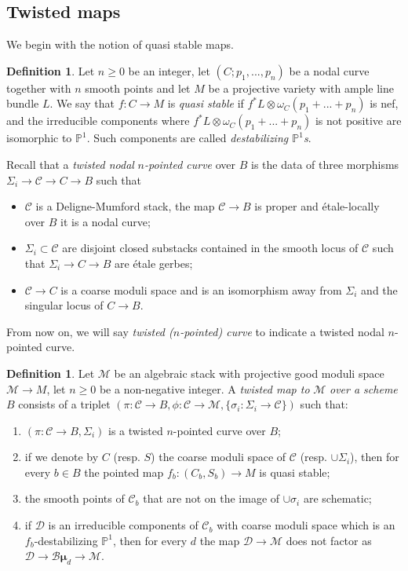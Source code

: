 \documentclass{amsart}
\newcommand{\bP}{\mathbb{P}}
\newcommand{\cB}{\mathcal{B}}
\newcommand{\cC}{\mathcal{C}}
\newcommand{\cD}{\mathcal{D}}
\newcommand{\cM}{\mathcal{M}}
\newcommand{\bmu}{\bm{\mu}}
\theoremstyle{definition}
\newtheorem{Def}[theorem]{Definition}
\begin{document}
\subsection{Twisted maps}\label{subsection twisted maps def}
We begin with the notion of quasi stable maps.
\begin{Def}
Let $n\ge 0$ be an integer, let $(C;p_1,...,p_n)$ be a nodal curve together with $n$ smooth points and let $M$ be a projective variety with ample line bundle $L$. We say that $f:C\to M$ is \emph{quasi stable} if $f^*L\otimes \omega_C(p_1+...+p_n)$ is nef, and the irreducible components where $f^*L\otimes \omega_C(p_1+...+p_n)$ is not positive are isomorphic to $\bP^1$. Such components are called \emph{destabilizing $\bP^1$s}. 
\end{Def}
Recall \cite[Definition 4.1.2]{AV_compactifying} that a \emph{twisted nodal} $n$\emph{-pointed curve} over $B$ is the data of three morphisms
$\Sigma_i\to \cC\to C\to B$
such that 
\begin{itemize}
    \item $\cC$ is a Deligne-Mumford stack, the map $\cC\to B$ is proper and \'{e}tale-locally over $B$ it is a nodal curve;
    \item $\Sigma_i\subset \cC$ are disjoint closed substacks contained in the smooth locus of $\cC$ such that $\Sigma_i\to C \to B$ are \'{e}tale gerbes;
    \item $\cC\to C$ is a coarse moduli space and is an isomorphism away from $\Sigma_i$ and the singular locus of $C\to B$.
\end{itemize}
From now on, we will say \emph{twisted ($n$-pointed) curve} to indicate a twisted nodal $n$-pointed curve.
\begin{Def}\label{def twisted map} 
Let $\cM$ be an algebraic stack with projective good moduli space $\cM\to M$, let $n\ge 0$ be a non-negative integer. A \emph{twisted map to} $\cM$ \emph{over a scheme} $B$ consists of a triplet $(\pi:\cC\to B, \phi:\cC\to \cM,\{\sigma_i : \Sigma_i \to \cC\})$ such that:
\begin{enumerate}
\item $(\pi:\cC\to B,\Sigma_i)$ is a twisted $n$-pointed curve over $B$;
\item if we denote by $C$ (resp. $S$) the coarse moduli space of $\cC$ (resp. $\cup \Sigma_i$), then for every $b\in B$ the pointed map $f_b:(C_b,S_b)\to M$ is quasi stable;
    \item the smooth points of $\cC_b$ that are not on the image of $\cup\sigma_i$ are schematic;
   \item if $\cD$ is an irreducible components of $\cC_b$ with coarse moduli space which is an $f_b$-destabilizing $\bP^1$, then for every $d$ the map $\cD\to\cM$ does not factor as $\cD\to \cB\bmu_d\to\cM$. 
    \end{enumerate}
\end{Def}
\end{document}
